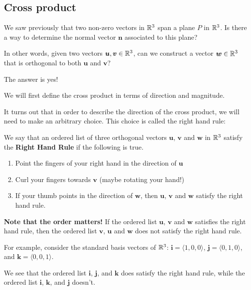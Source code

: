 \subsection{Cross product}

We saw previously that two non-zero vectors in $\mathbb{R}^3$ span a plane $P$ in $\mathbb{R}^3$.  Is there a way to determine the normal vector $\bm{n}$ associated to this plane?

\begin{motivating}

In other words, given two vectors $\bm{u}, \bm{v} \in \mathbb{R}^3$, can we construct a vector $\bm{w} \in \mathbb{R}^3$ that is orthogonal to both $\bm{u}$ and $\bm{v}$?
\end{motivating} 

The answer is yes!  

We will first define the cross product in terms of direction and magnitude.

It turns out that in order to describe the direction of the cross product, we will need to make an arbitrary choice. This choice is called the right hand rule: 

\begin{definition}
    We say that an ordered list of three orthogonal vectors $\bm{u}$, $\bm{v}$ and $\bm{w}$ in $\mathbb{R}^3$ satisfy the \textbf{Right Hand Rule} if the following is true.
    
    \begin{enumerate}
        \item Point the fingers of your right hand in the direction of $\bm{u}$
        \item Curl your fingers towards $\bm{v}$ (maybe rotating your hand!)
        \item If your thumb points in the direction of $\bm{w}$, then $\bm{u}$, $\bm{v}$ and $\bm{w}$ satisfy the right hand rule.
    \end{enumerate}
    
    \end{definition}

\textbf{Note that the order matters!} If the ordered list $\bm{u}$, $\bm{v}$ and $\bm{w}$ satisfies the right hand rule, then the ordered list $\bm{v}$, $\bm{u}$ and $\bm{w}$ does not satisfy the right hand rule.

\begin{example}
    For example, consider the standard basis vectors of $\mathbb{R}^3$:  $\bm{i} = \langle 1, 0 , 0 \rangle$, $\bm{j}= \langle 0,1 , 0 \rangle$, and $\bm{k}= \langle 0 , 0,1 \rangle$.

    We see that the ordered list $\bm{i}$, $\bm{j}$, and $\bm{k}$ does satisfy the right hand rule, while the ordered list $\bm{i}$, $\bm{k}$, and $\bm{j}$ doesn't.
\end{example}


